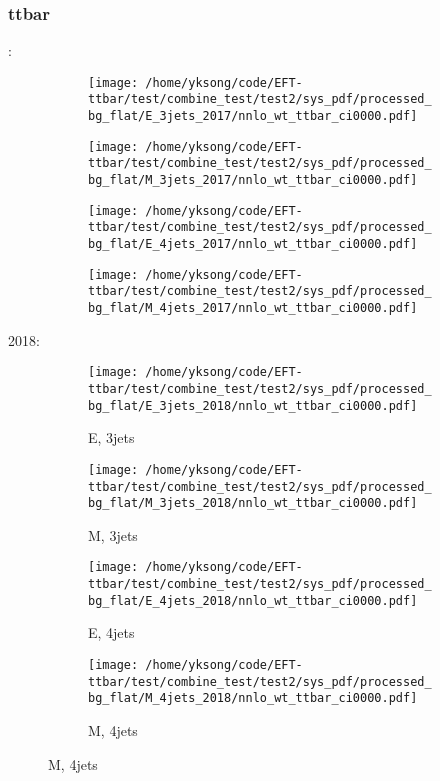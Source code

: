 \documentclass{beamer}
\begin{document}
\begin{frame}
\frametitle{ttbar}
\fontsize{5}{1}:
\begin{figure}
\centering
\begin{subfigure}[b]{0.24\textwidth}
\texttt{[image: /home/yksong/code/EFT-ttbar/test/combine\_test/test2/sys\_pdf/processed\_bg\_flat/E\_3jets\_2017/nnlo\_wt\_ttbar\_ci0000.pdf]}
\end{subfigure}
\begin{subfigure}[b]{0.24\textwidth}
\texttt{[image: /home/yksong/code/EFT-ttbar/test/combine\_test/test2/sys\_pdf/processed\_bg\_flat/M\_3jets\_2017/nnlo\_wt\_ttbar\_ci0000.pdf]}
\end{subfigure}
\begin{subfigure}[b]{0.24\textwidth}
\texttt{[image: /home/yksong/code/EFT-ttbar/test/combine\_test/test2/sys\_pdf/processed\_bg\_flat/E\_4jets\_2017/nnlo\_wt\_ttbar\_ci0000.pdf]}
\end{subfigure}
\begin{subfigure}[b]{0.24\textwidth}
\texttt{[image: /home/yksong/code/EFT-ttbar/test/combine\_test/test2/sys\_pdf/processed\_bg\_flat/M\_4jets\_2017/nnlo\_wt\_ttbar\_ci0000.pdf]}
\end{subfigure}
\end{figure}
2018:
\begin{figure}
\centering
\begin{subfigure}[b]{0.24\textwidth}
\texttt{[image: /home/yksong/code/EFT-ttbar/test/combine\_test/test2/sys\_pdf/processed\_bg\_flat/E\_3jets\_2018/nnlo\_wt\_ttbar\_ci0000.pdf]}
\captionsetup{font=tiny}
\caption{E, 3jets}
\end{subfigure}
\begin{subfigure}[b]{0.24\textwidth}
\texttt{[image: /home/yksong/code/EFT-ttbar/test/combine\_test/test2/sys\_pdf/processed\_bg\_flat/M\_3jets\_2018/nnlo\_wt\_ttbar\_ci0000.pdf]}
\captionsetup{font=tiny}
\caption{M, 3jets}
\end{subfigure}
\begin{subfigure}[b]{0.24\textwidth}
\texttt{[image: /home/yksong/code/EFT-ttbar/test/combine\_test/test2/sys\_pdf/processed\_bg\_flat/E\_4jets\_2018/nnlo\_wt\_ttbar\_ci0000.pdf]}
\captionsetup{font=tiny}
\caption{E, 4jets}
\end{subfigure}
\begin{subfigure}[b]{0.24\textwidth}
\texttt{[image: /home/yksong/code/EFT-ttbar/test/combine\_test/test2/sys\_pdf/processed\_bg\_flat/M\_4jets\_2018/nnlo\_wt\_ttbar\_ci0000.pdf]}
\captionsetup{font=tiny}
\caption{M, 4jets}
\end{subfigure}
\end{figure}
\end{frame}
\end{document}
